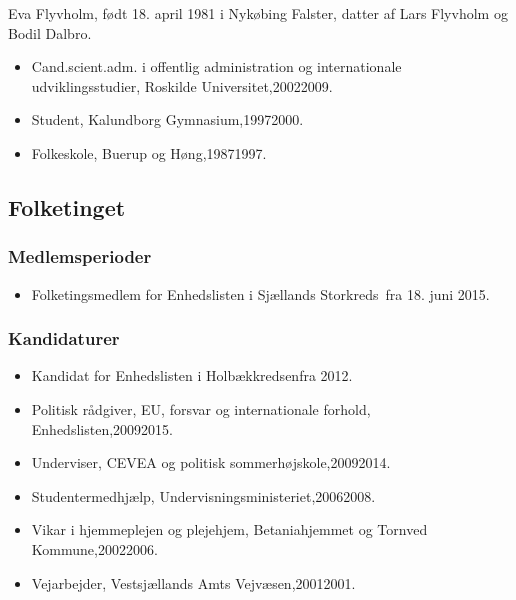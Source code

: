\documentclass[11pt, a4paper]{awesome-cv}
\begin{document}
\makecvheader[R]
\makelettertitle
\begin{cvletter}
Eva Flyvholm, født 18. april 1981 i Nykøbing Falster, datter af Lars Flyvholm og Bodil Dalbro.

\begin{itemize}
\item Cand.scient.adm. i offentlig administration og internationale udviklingsstudier, Roskilde Universitet,20022009.
\item Student, Kalundborg Gymnasium,19972000.
\item Folkeskole, Buerup og Høng,19871997.
\end{itemize}
\subsection*{Folketinget}
\subsubsection*{Medlemsperioder}
\begin{itemize}
\item Folketingsmedlem for Enhedslisten i Sjællands Storkreds fra 18. juni 2015.
\end{itemize}
\subsubsection*{Kandidaturer}
\begin{itemize}
\item Kandidat for Enhedslisten i Holbækkredsenfra 2012.
\end{itemize}
\begin{itemize}
\item Politisk rådgiver, EU, forsvar og internationale forhold, Enhedslisten,20092015.
\item Underviser, CEVEA og politisk sommerhøjskole,20092014.
\item Studentermedhjælp, Undervisningsministeriet,20062008.
\item Vikar i hjemmeplejen og plejehjem, Betaniahjemmet og Tornved Kommune,20022006.
\item Vejarbejder, Vestsjællands Amts Vejvæsen,20012001.
\end{itemize}
\end{cvletter}
\end{document}
